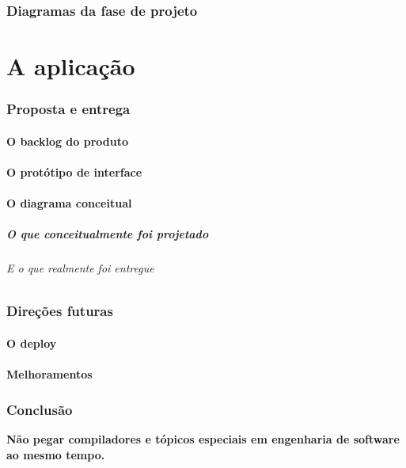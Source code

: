 \documentclass[hyperref={pdfpagelabels=false},11pt]{beamer}
\begin{document}
		\section{Diagramas da fase de projeto}
	\part{A aplicação}
		\section{Proposta e entrega}
			\subsection{O backlog do produto}
			\subsection{O protótipo de interface}
			\subsection{O diagrama conceitual}
				\begin{frame}
					\frametitle{O que conceitualmente foi projetado}
					\framesubtitle{E o que realmente foi entregue}
				\end{frame}
					
		\section{Direções futuras}
			\subsection{O deploy}
			\subsection{Melhoramentos}
		\section{Conclusão}
			\begin{center}
				\textbf{Não pegar compiladores e tópicos especiais em engenharia de software ao mesmo tempo.}
			\end{center}
\end{document}
